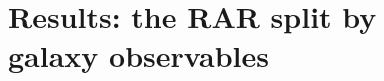 \documentclass[usenatbib]{mnras}
\newcommand{\hMpc}{\, h^{-1}{\rm{Mpc}} }
\newcommand{\mpss}{ {\rm m/s^2} }
\newcommand{\un}[1]{_{\rm #1}}
\begin{document}

\section{Results: the RAR split by \\ galaxy observables}
\label{sec:results-observables}
\end{document}
